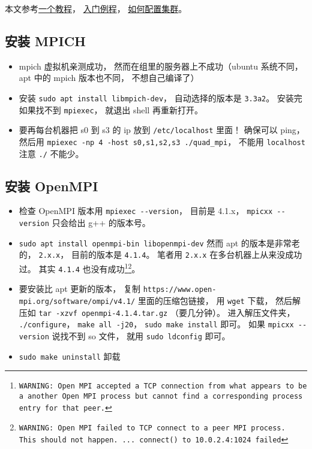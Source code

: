 
\begin{issues}
\issueDraft
\end{issues}

本文参考\href{https://www.codingame.com/playgrounds/349/introduction-to-mpi/introduction-to-distributed-computing}{一个教程}， \href{https://people.sc.fsu.edu/~jburkardt/cpp_src/hello_mpi/hello_mpi.html}{入门例程}， \href{https://mpitutorial.com/tutorials/running-an-mpi-cluster-within-a-lan/}{如何配置集群}。

\subsection{安装 MPICH}
\begin{itemize}
\item mpich 虚拟机亲测成功， 然而在组里的服务器上不成功（ubuntu 系统不同， apt 中的 mpich 版本也不同， 不想自己编译了）
\item 安装 \verb|sudo apt install libmpich-dev|， 自动选择的版本是 \verb|3.3a2|。 安装完如果找不到 \verb|mpiexec|， 就退出 shell 再重新打开。
\item 要再每台机器把 s0 到 s3 的 ip 放到 \verb|/etc/localhost| 里面！ 确保可以 ping， 然后用 \verb|mpiexec -np 4 -host s0,s1,s2,s3 ./quad_mpi|， 不能用 \verb|localhost| 注意 \verb|./| 不能少。
\end{itemize}

\subsection{安装 OpenMPI}
\begin{itemize}
\item 检查 OpenMPI 版本用 \verb|mpiexec --version|， 目前是 4.1.x， \verb|mpicxx --version| 只会给出 g++ 的版本号。
\item \verb|sudo apt install openmpi-bin libopenmpi-dev| 然而 apt 的版本是非常老的， \verb|2.x.x|， 目前的版本是 \verb|4.1.4|。 笔者用 \verb|2.x.x| 在多台机器上从来没成功过。 其实 \verb|4.1.4| 也没有成功\footnote{\verb`WARNING: Open MPI accepted a TCP connection from what appears to be a another Open MPI process but cannot find a corresponding process entry for that peer.`}\footnote{\verb`WARNING: Open MPI failed to TCP connect to a peer MPI process.  This should not happen. ... connect() to 10.0.2.4:1024 failed`}。
\item 要安装比 apt 更新的版本， 复制 \verb|https://www.open-mpi.org/software/ompi/v4.1/| 里面的压缩包链接， 用 \verb|wget| 下载， 然后解压如 \verb|tar -xzvf openmpi-4.1.4.tar.gz| （要几分钟）。 进入解压文件夹， \verb|./configure|， \verb|make all -j20|， \verb|sudo make install| 即可。 如果 \verb|mpicxx --version| 说找不到 so 文件， 就用 \verb|sudo ldconfig| 即可。
\item \verb|sudo make uninstall| 卸载
\end{itemize}

